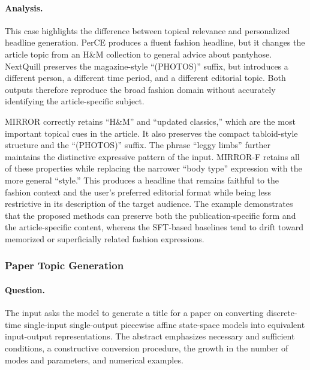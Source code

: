 \documentclass{article} %
\begin{document}
\paragraph{Analysis.}
This case highlights the difference between topical relevance and personalized headline generation. PerCE produces a fluent fashion headline, but it changes the article topic from an H\&M collection to general advice about pantyhose. NextQuill preserves the magazine-style ``(PHOTOS)'' suffix, but introduces a different person, a different time period, and a different editorial topic. Both outputs therefore reproduce the broad fashion domain without accurately identifying the article-specific subject.

MIRROR correctly retains ``H\&M'' and ``updated classics,'' which are the most important topical cues in the article. It also preserves the compact tabloid-style structure and the ``(PHOTOS)'' suffix. The phrase ``leggy limbs'' further maintains the distinctive expressive pattern of the input. MIRROR-F retains all of these properties while replacing the narrower ``body type'' expression with the more general ``style.'' This produces a headline that remains faithful to the fashion context and the user's preferred editorial format while being less restrictive in its description of the target audience. The example demonstrates that the proposed methods can preserve both the publication-specific form and the article-specific content, whereas the SFT-based baselines tend to drift toward memorized or superficially related fashion expressions.

\subsubsection{Paper Topic Generation}

\paragraph{Question.}
The input asks the model to generate a title for a paper on converting discrete-time single-input single-output piecewise affine state-space models into equivalent input-output representations. The abstract emphasizes necessary and sufficient conditions, a constructive conversion procedure, the growth in the number of modes and parameters, and numerical examples.
\end{document}
